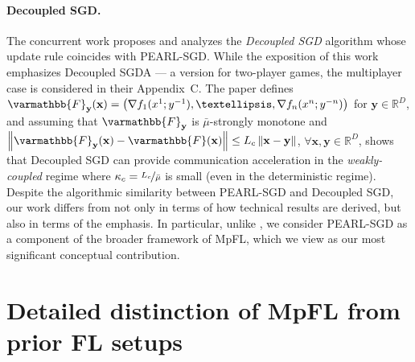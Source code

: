 \documentclass{article}
\newcommand{\algname}[1]{{\color{PineGreen}\sf  #1}\xspace}
\newcommand{\vx}{{\mathbf{x}}}
\newcommand{\vy}{{\mathbf{y}}}
\newcommand{\reals}{\mathbb{R}}
\newcommand{\opF}{{\varmathbb{F}}}
\newcommand{\norm}[1]{\left\|#1\right\|}
\newcommand{\abbvname}{\algname{PEARL-SGD}}
\theoremstyle{plain}
\theoremstyle{remark}
\begin{document}
\paragraph{Decoupled SGD.} %

The concurrent work \cite{zindari2025decoupled} proposes and analyzes the \textit{Decoupled SGD} algorithm whose update rule coincides with \abbvname. While the exposition of this work emphasizes Decoupled SGDA --- a version for two-player games, the multiplayer case is considered in their Appendix~C.
The paper defines $\opF_\vy (\vx) = \left(\nabla f_1(x^1; y^{-1}), \dots, \nabla f_n(x^n; y^{-n})\right)$ for $\vy \in \reals^D$, and assuming that $\opF_\vy$ is $\bar{\mu}$-strongly monotone and $\norm{\opF_\vy(\vx) - \opF(\vx)} \le L_c \norm{\vx - \vy}$, $\forall \vx,\vy\in \reals^D$, shows that Decoupled SGD can provide communication acceleration in the \textit{weakly-coupled} regime where $\kappa_c = \nicefrac{L_c}{\bar{\mu}}$ is small (even in the deterministic regime).
Despite the algorithmic similarity between \abbvname and Decoupled SGD, our work differs from \cite{zindari2025decoupled} not only in terms of how technical results are derived, but also in terms of the emphasis. In particular, unlike \cite{zindari2025decoupled}, we consider \abbvname as a component of the broader framework of MpFL, which we view as our most significant conceptual contribution.

\newpage

\section{Detailed distinction of MpFL from prior FL setups}
\label{section:distinction-from-prior-FL}
\end{document}
